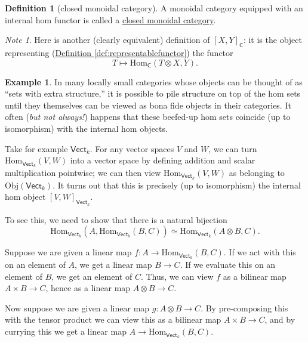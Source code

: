\documentclass[a4paper,10pt]{scrreprt}
\newcommand{\defn}[1]{\ul{#1}}
\newcommand{\Obj}{\mathrm{Obj}}
\newcommand{\Hom}{\mathrm{Hom}}
\theoremstyle{definition}
\newtheorem{definition}{Definition}[section]
\newtheorem{example}{Example}[section]
\theoremstyle{plain}
\theoremstyle{remark}
\newtheorem{note}{Note}[section]
\begin{document}
\begin{definition}[closed monoidal category]
  \label{def:closedmonoidalcategory}
  A monoidal category equipped with an internal hom functor is called a \defn{closed monoidal category}.
\end{definition}

\begin{note}
  Here is another (clearly equivalent) definition of $[X, Y]_{\mathsf{C}}$: it is the object representing (\hyperref[def:representablefunctor]{Definition \ref*{def:representablefunctor}}) the functor
  \begin{equation*}
    T \mapsto \Hom_\mathsf{C}(T \otimes X, Y).
  \end{equation*}
\end{note}

\begin{example}
  In many locally small categories whose objects can be thought of as ``sets with extra structure,'' it is possible to pile structure on top of the hom sets until they themselves can be viewed as bona fide objects in their categories. It often (\emph{but not always!}) happens that these beefed-up hom sets coincide (up to isomorphism) with the internal hom objects.

  Take for example $\mathsf{Vect}_{k}$. For any vector spaces $V$ and $W$, we can turn $\Hom_{\mathsf{Vect}_{k}}(V, W)$ into a vector space by defining addition and scalar multiplication pointwise; we can then view $\Hom_{\mathsf{Vect}_{k}}(V, W)$ as belonging to $\Obj(\mathsf{Vect}_{k})$. It turns out that this is precisely (up to isomorphism) the internal hom object $[V, W]_{\mathsf{Vect}_{k}}$.

  To see this, we need to show that there is a natural bijection 
  \begin{equation*}
    \Hom_{\mathsf{Vect}_{k}}(A, \Hom_{\mathsf{Vect}_{k}}(B, C)) \simeq \Hom_{\mathsf{Vect}_{k}}(A \otimes B, C).
  \end{equation*}

  Suppose we are given a linear map $f\colon A \to \Hom_{\mathsf{Vect}_{k}}(B, C)$. If we act with this on an element of $A$, we get a linear map $B \to C$. If we evaluate this on an element of $B$, we get an element of $C$. Thus, we can view $f$ as a bilinear map $A \times B \to C$, hence as a linear map $A \otimes B \to C$.

  Now suppose we are given a linear map $g\colon A \otimes B \to C$. By pre-composing this with the tensor product we can view this as a bilinear map $A \times B \to C$, and by currying this we get a linear map $A \to \Hom_{\mathsf{Vect}_{k}}(B, C)$.
\end{example}
\end{document}

